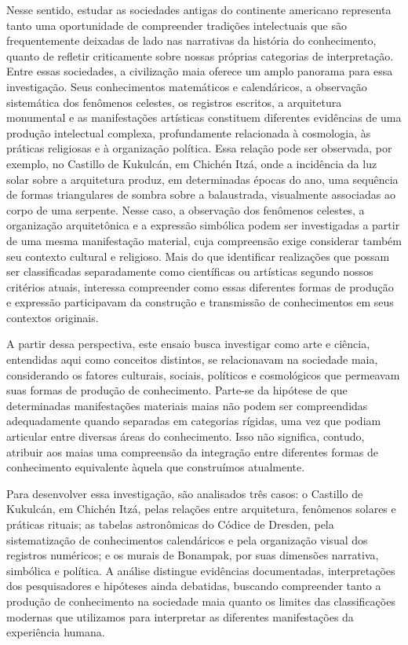 \documentclass[11pt, a4paper]{article}
\begin{document}
Nesse sentido, estudar as sociedades antigas do continente americano representa tanto uma oportunidade de compreender tradições intelectuais que são frequentemente deixadas de lado nas narrativas da história do conhecimento, quanto de refletir criticamente sobre nossas próprias categorias de interpretação. Entre essas sociedades, a civilização maia oferece um amplo panorama para essa investigação. Seus conhecimentos matemáticos e calendáricos, a observação sistemática dos fenômenos celestes, os registros escritos, a arquitetura monumental e as manifestações artísticas constituem diferentes evidências de uma produção intelectual complexa, profundamente relacionada à cosmologia, às práticas religiosas e à organização política. Essa relação pode ser observada, por exemplo, no Castillo de Kukulcán, em Chichén Itzá, onde a incidência da luz solar sobre a arquitetura produz, em determinadas épocas do ano, uma sequência de formas triangulares de sombra sobre a balaustrada, visualmente associadas ao corpo de uma serpente. Nesse caso, a observação dos fenômenos celestes, a organização arquitetônica e a expressão simbólica podem ser investigadas a partir de uma mesma manifestação material, cuja compreensão exige considerar também seu contexto cultural e religioso. Mais do que identificar realizações que possam ser classificadas separadamente como científicas ou artísticas segundo nossos critérios atuais, interessa compreender como essas diferentes formas de produção e expressão participavam da construção e transmissão de conhecimentos em seus contextos originais.

A partir dessa perspectiva, este ensaio busca investigar como arte e ciência, entendidas aqui como conceitos distintos, se relacionavam na sociedade maia, considerando os fatores culturais, sociais, políticos e cosmológicos que permeavam suas formas de produção de conhecimento. Parte-se da hipótese de que determinadas manifestações materiais maias não podem ser compreendidas adequadamente quando separadas em categorias rígidas, uma vez que podiam articular entre diversas áreas do conhecimento. Isso não significa, contudo, atribuir aos maias uma compreensão da integração entre diferentes formas de conhecimento equivalente àquela que construímos atualmente.

Para desenvolver essa investigação, são analisados três casos: o Castillo de Kukulcán, em Chichén Itzá, pelas relações entre arquitetura, fenômenos solares e práticas rituais; as tabelas astronômicas do Códice de Dresden, pela sistematização de conhecimentos calendáricos e pela organização visual dos registros numéricos; e os murais de Bonampak, por suas dimensões narrativa, simbólica e política. A análise distingue evidências documentadas, interpretações dos pesquisadores e hipóteses ainda debatidas, buscando compreender tanto a produção de conhecimento na sociedade maia quanto os limites das classificações modernas que utilizamos para interpretar as diferentes manifestações da experiência humana.
\end{document}
